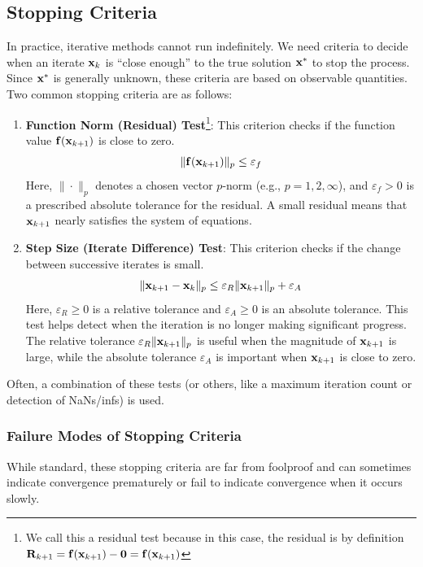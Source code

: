 \subsection{Stopping Criteria}
In practice, iterative methods cannot run indefinitely. We need criteria to decide when an iterate $\mathbf{x}_k$ is ``close enough'' to the true solution $\mathbf{x}^*$ to stop the process. Since $\mathbf{x}^*$ is generally unknown, these criteria are based on observable quantities. Two common stopping criteria are as follows:

\begin{enumerate}
    \item \textbf{Function Norm (Residual) Test}\footnote{We call this a residual test because in this case, the residual is by definition $\mathbf{R}_{k+1} = \mathbf{f}(\mathbf{x}_{k+1}) - \mathbf{0} = \mathbf{f}(\mathbf{x}_{k+1})$}: This criterion checks if the function value $\mathbf{f}(\mathbf{x}_{k+1})$ is close to zero.
    \[
        \|\mathbf{f}(\mathbf{x}_{k+1})\|_p \le \varepsilon_f
    \]
    Here, $\|\cdot\|_p$ denotes a chosen vector $p$-norm (e.g., $p=1, 2, \infty$), and $\varepsilon_f > 0$ is a prescribed absolute tolerance for the residual. A small residual means that $\mathbf{x}_{k+1}$ nearly satisfies the system of equations.

    \item \textbf{Step Size (Iterate Difference) Test}: This criterion checks if the change between successive iterates is small.
    \[
        \|\mathbf{x}_{k+1} - \mathbf{x}_k\|_p \le \varepsilon_R \|\mathbf{x}_{k+1}\|_p + \varepsilon_A
    \]
    Here, $\varepsilon_R \ge 0$ is a relative tolerance and $\varepsilon_A \ge 0$ is an absolute tolerance. This test helps detect when the iteration is no longer making significant progress. The relative tolerance $\varepsilon_R \|\mathbf{x}_{k+1}\|_p$ is useful when the magnitude of $\mathbf{x}_{k+1}$ is large, while the absolute tolerance $\varepsilon_A$ is important when $\mathbf{x}_{k+1}$ is close to zero.
\end{enumerate}
Often, a combination of these tests (or others, like a maximum iteration count or detection of NaNs/infs) is used.

\subsubsection{Failure Modes of Stopping Criteria}
While standard, these stopping criteria are far from foolproof and can sometimes indicate convergence prematurely or fail to indicate convergence when it occurs slowly.

